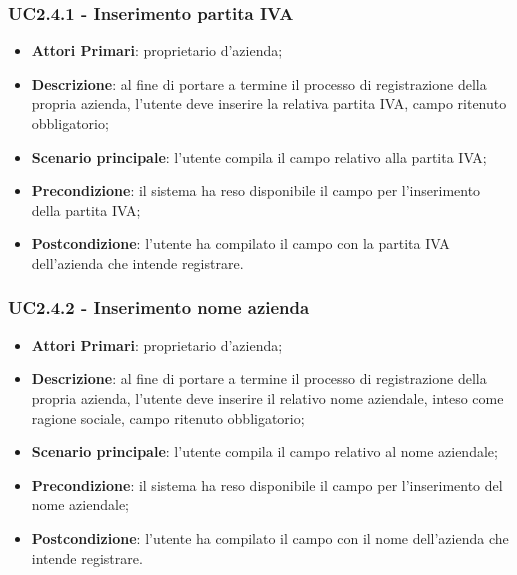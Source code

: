 \subsubsection{UC2.4.1 - Inserimento partita IVA}
\begin{itemize}
	\item \textbf{Attori Primari}: proprietario d'azienda;
	\item \textbf{Descrizione}: al fine di portare a termine il processo di registrazione della propria azienda, l'utente deve inserire la relativa partita IVA, campo ritenuto obbligatorio;
	\item \textbf{Scenario principale}: l'utente compila il campo relativo alla partita IVA;
	\item \textbf{Precondizione}: il sistema ha reso disponibile il campo per l'inserimento della partita IVA;
	\item \textbf{Postcondizione}: l'utente ha compilato il campo con la partita IVA dell'azienda che intende registrare.
\end{itemize}
\subsubsection{UC2.4.2 - Inserimento nome azienda}
\begin{itemize}
	\item \textbf{Attori Primari}: proprietario d'azienda;
	\item \textbf{Descrizione}: al fine di portare a termine il processo di registrazione della propria azienda, l'utente deve inserire il relativo nome aziendale, inteso come ragione sociale, campo ritenuto obbligatorio;
	\item \textbf{Scenario principale}: l'utente compila il campo relativo al nome aziendale;
	\item \textbf{Precondizione}: il sistema ha reso disponibile il campo per l'inserimento del nome aziendale;
	\item \textbf{Postcondizione}: l'utente ha compilato il campo con il nome dell'azienda che intende registrare.
\end{itemize}




